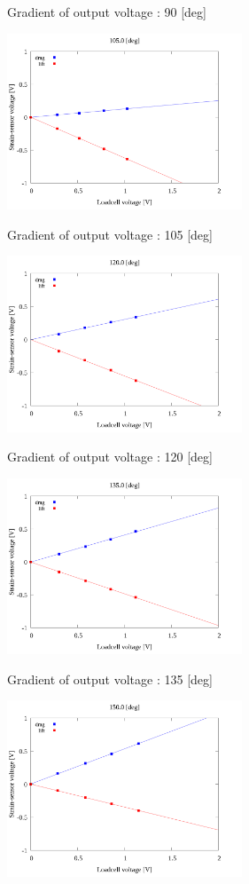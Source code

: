 \begin{multicols}{2}
\begin{figure_here}
\begin{center}
            \caption{Gradient of output voltage : 90 [deg]}
            \includegraphics[width=70mm]{../../02_workspace/result/2-1/plot/04/04_linear_1050.png}
            \caption{Gradient of output voltage : 105 [deg]}
            \includegraphics[width=70mm]{../../02_workspace/result/2-1/plot/04/04_linear_1200.png}
            \caption{Gradient of output voltage : 120 [deg]}
            \includegraphics[width=70mm]{../../02_workspace/result/2-1/plot/04/04_linear_1350.png}
            \caption{Gradient of output voltage : 135 [deg]}
            \includegraphics[width=70mm]{../../02_workspace/result/2-1/plot/04/04_linear_1500.png}

\end{center}
\end{figure_here}
\end{multicols}
